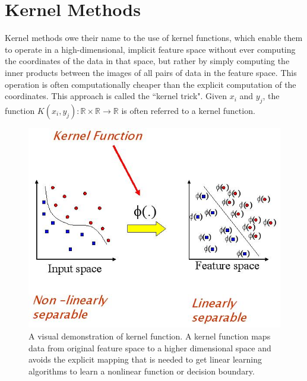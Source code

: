 \documentclass[12pt]{report} %
\begin{document}
\section{Kernel Methods}
Kernel methods owe their name to the use of kernel functions, which enable them to operate in a high-dimensional, implicit feature space without ever computing the coordinates of the data in that space, but rather by simply computing the inner products between the images of all pairs of data in the feature space. This operation is often computationally cheaper than the explicit computation of the coordinates. This approach is called the ``kernel trick"\cite{PR}. Given $x_{i}$ and $y_{j}$, the function $K(x_{i},y_{j}): \mathbb{R} \times \mathbb{R} \to \mathbb{R}$ is often referred to a kernel function.
\begin{figure}[H]
	\centering
	\includegraphics[scale=0.6]{pictures/kernel.jpg}
	\caption{A visual demonstration of kernel function. A kernel function maps data from original feature space to a higher dimensional space and avoids the explicit mapping that is needed to get linear learning algorithms to learn a nonlinear function or decision boundary\cite{KPIC}.}
	\label{fig:4}
\end{figure}
\end{document}
